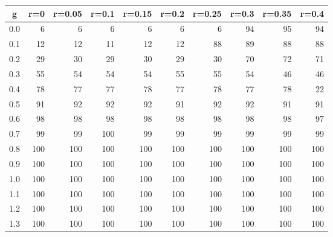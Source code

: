 %
\begin{table}[!tbp]
 \begin{center}
 \begin{tabular}{rrrrrrrrrr}\hline\hline
\multicolumn{1}{c}{g}&\multicolumn{1}{c}{r=0}&\multicolumn{1}{c}{r=0.05}&\multicolumn{1}{c}{r=0.1}&\multicolumn{1}{c}{r=0.15}&\multicolumn{1}{c}{r=0.2}&\multicolumn{1}{c}{r=0.25}&\multicolumn{1}{c}{r=0.3}&\multicolumn{1}{c}{r=0.35}&\multicolumn{1}{c}{r=0.4}\tabularnewline
\hline
0.0&  6&  6&  6&  6&  6&  6& 94& 95& 94\tabularnewline
0.1& 12& 12& 11& 12& 12& 88& 89& 88& 88\tabularnewline
0.2& 29& 30& 29& 30& 29& 30& 70& 72& 71\tabularnewline
0.3& 55& 54& 54& 54& 55& 55& 54& 46& 46\tabularnewline
0.4& 78& 77& 77& 78& 77& 78& 77& 78& 22\tabularnewline
0.5& 91& 92& 92& 92& 91& 92& 92& 91& 91\tabularnewline
0.6& 98& 98& 98& 98& 98& 98& 98& 98& 97\tabularnewline
0.7& 99& 99&100& 99& 99& 99& 99& 99& 99\tabularnewline
0.8&100&100&100&100&100&100&100&100&100\tabularnewline
0.9&100&100&100&100&100&100&100&100&100\tabularnewline
1.0&100&100&100&100&100&100&100&100&100\tabularnewline
1.1&100&100&100&100&100&100&100&100&100\tabularnewline
1.2&100&100&100&100&100&100&100&100&100\tabularnewline
1.3&100&100&100&100&100&100&100&100&100\tabularnewline
\hline
\end{tabular}

\end{center}

\end{table}

